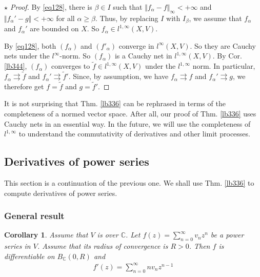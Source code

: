\documentclass[12pt,b5paper,notitlepage]{article}
\theoremstyle{definition}
\theoremstyle{plain}
\newtheorem{co}[df]{Corollary}
\newcommand{\wtd}{\widetilde}
\newcommand{\Cbb}{\mathbb C}
\numberwithin{equation}{section}
\begin{document}
\begin{proof}[$\star$ Proof]
By \eqref{eq128}, there is $\beta\in I$ such that $\Vert f_\alpha-f\Vert_\infty<+\infty$ and $\Vert f_\alpha'-g\Vert<+\infty$ for all $\alpha\geq\beta$. Thus, by replacing $I$ with $I_\beta$, we assume that $f_\alpha$ and $f_\alpha'$ are bounded on $X$. So $f_\alpha\in l^{1,\infty}(X,V)$. 

By \eqref{eq128}, both $(f_\alpha)$ and $(f'_\alpha)$ converge in $l^\infty(X,V)$. So they are Cauchy nets under the $l^\infty$-norm. So $(f_\alpha)$ is a Cauchy net in $l^{1,\infty}(X,V)$. By Cor. \ref{lb344}, $(f_\alpha)$ converges to $\wtd f\in l^{1,\infty}(X,V)$ under the $l^{1,\infty}$ norm. In particular, $f_\alpha\rightrightarrows \wtd f$ and $f_\alpha'\rightrightarrows \wtd f'$. Since, by assumption, we have $f_\alpha\rightrightarrows f$ and $f_\alpha'\rightrightarrows g$, we therefore get $f=\wtd f$ and $g=\wtd f'$.
\end{proof}



It is not surprising that Thm. \ref{lb336} can be rephrased in terms of the completeness of a normed vector space. After all, our proof of Thm. \ref{lb336} uses Cauchy nets in an essential way. In the future, we will use the completeness of $l^{1,\infty}$ to understand the commutativity of derivatives and other limit processes. 








\subsection{Derivatives of power series}


This section is a continuation of the previous one. We shall use Thm. \ref{lb336} to compute derivatives of power series.



\subsubsection{General result}


\begin{co}\label{lb338}
Assume that $V$ is over $\Cbb$. Let $f(z)=\sum_{n=0}^\infty v_nz^n$ be a power series in $V$. Assume that its radius of convergence is $R>0$. Then $f$ is differentiable on $B_\Cbb(0,R)$ and
\begin{align*}
f'(z)=\sum_{n=0}^\infty nv_nz^{n-1} 
\end{align*}
\end{co}
\end{document}
